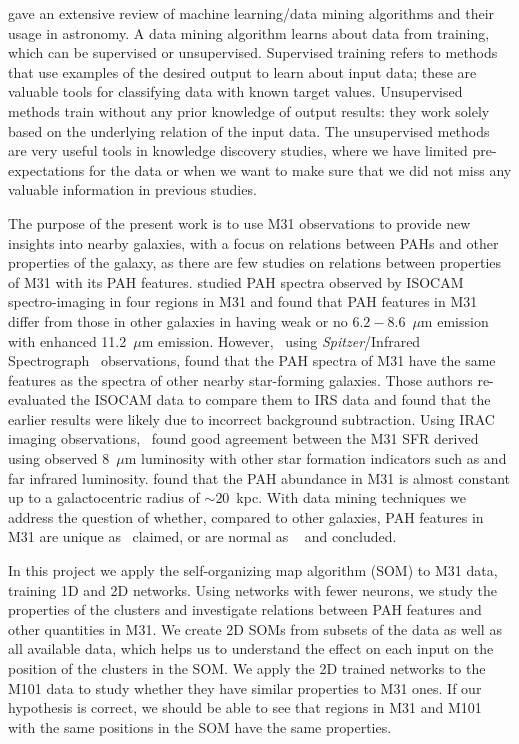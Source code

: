 \cite{Ball10} gave an extensive review of machine learning/data mining algorithms and their usage in astronomy.
A data mining algorithm learns about data from training, which can be supervised or unsupervised.
Supervised training refers to methods that use examples of the desired output to learn about input data; these are valuable tools for classifying data with known target values.
Unsupervised methods train without any prior knowledge of output results: 
they work solely based on the underlying relation of the input data.   
The unsupervised methods are very useful tools in knowledge discovery studies, where we have limited pre-expectations for the data or when we want to make sure that we did not miss any valuable information in previous studies.

The purpose of the present work is to use M31 observations to provide new insights into nearby galaxies, with a focus on relations between PAHs and other properties of the galaxy,
as there are few studies on relations between properties of M31 with its PAH features.
\cite{Cesarsky98} studied PAH spectra observed by ISOCAM spectro-imaging in four regions in M31 and found that PAH features in M31 differ from those in other galaxies in having weak or no $6.2 - 8.6$~$\mu$m emission with enhanced 11.2~$\mu$m emission. 
However,~\cite{Dim15} using {\it Spitzer}/Infrared Spectrograph~\citep[IRS;][]{Houck04b} observations, found that the PAH spectra of M31 have the same features as the spectra of other nearby star-forming galaxies.
Those authors re-evaluated the ISOCAM data to compare them to IRS data and found that the earlier results were likely due to incorrect background subtraction.
Using IRAC imaging observations,~\cite{Barmby06} found good agreement between the M31 SFR derived using observed 8~$\mu$m luminosity with other 
star formation indicators such as \halpha and far infrared luminosity.
\cite{Draine14} found that the PAH abundance in M31 is almost constant up to a galactocentric radius of $\sim 20$~kpc.
With data mining techniques we address the question of whether,
compared to other galaxies, PAH features in M31 are unique as~\cite{Cesarsky98} claimed, or are normal as ~\cite{Dim15} and \cite{Draine14} concluded.


In this project we apply the self-organizing map algorithm (SOM) to M31 data, training 1D and 2D networks.
Using networks with fewer neurons, we study the properties of the clusters and investigate relations between PAH features and other quantities in M31.
We create 2D SOMs from subsets of the data as well as all available data, which helps us to understand the effect on each input on the position of the clusters in the SOM.
We apply the 2D trained networks to the M101 data to study whether they have similar properties to M31 ones.
If our hypothesis is correct, we should be able to see that regions in M31 and M101 with the same positions in the SOM have the same properties.


